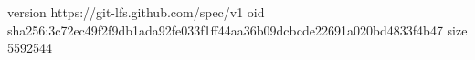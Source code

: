 version https://git-lfs.github.com/spec/v1
oid sha256:3c72ec49f2f9db1ada92fe033f1ff44aa36b09dcbcde22691a020bd4833f4b47
size 5592544
